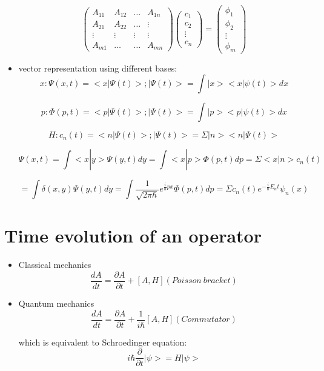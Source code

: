 \documentclass[12pt,a4paper]{article}
\begin{document}
\begin{itemize}
\[
 \begin{pmatrix}
   A_{11} & A_{12} & \dots    & A_{1n} \\
   A_{21} & A_{22} & \dots    & \vdots \\
   \vdots & \vdots & \vdots   & \vdots \\
   A_{m1} & \dots  & \dots    & A_{mn} 
 \end{pmatrix}
 \begin{pmatrix}
   c_{1}  \\
   c_{2}  \\
   \vdots  \\
   c_{n}   
 \end{pmatrix}
 =
 \begin{pmatrix}
   \phi _{1}  \\
   \phi _{2}  \\
   \vdots   \\
   \phi _{m}
 \end{pmatrix}
\]

\item vector representation using different bases:
\[
x: \Psi (x,t)= <x | \Psi (t) > ; | \Psi (t) > = \int |x><x| \psi (t) > dx
\]

\[
p: \Phi (p,t) = <p| \Psi (t) > ; | \Psi (t) > = \int |p><p| \psi (t) > dx
\]

\[
H: c_n (t)= <n | \Psi (t)> ; | \Psi (t)>= \Sigma |n><n | \Psi (t) >
\]

\[
\Psi (x,t) = \int <x|y> \Psi (y,t) dy = \int <x|p> \Phi (p,t) dp = \Sigma <x|n> c_n (t)
\]

\[
= \int \delta (x,y) \Psi (y,t) dy = \int \frac{1}{\sqrt{2 \pi \hbar}} e^{\frac{i}{\hbar}px} \Phi (p,t) dp = \Sigma c_n(t) e^{-\frac{i}{\hbar} E_n t} \psi _n (x)
\]


\end{itemize}

\pagebreak

\section{Time evolution of an operator}

\begin{itemize}

\item Classical mechanics
\[
\frac{dA}{dt}=\frac{\partial A}{\partial t} + [A,H](Poisson \ bracket)
\]

\item Quantum mechanics
\[
\frac{dA}{dt}= \frac{\partial A}{\partial t} + \frac{1}{i \hbar}[A,H] (Commutator)
\]

which is equivalent to Schroedinger equation:
\[
i \hbar \frac{\partial}{\partial t} | \psi > = H | \psi >
\]

\end{itemize}
\end{document}
